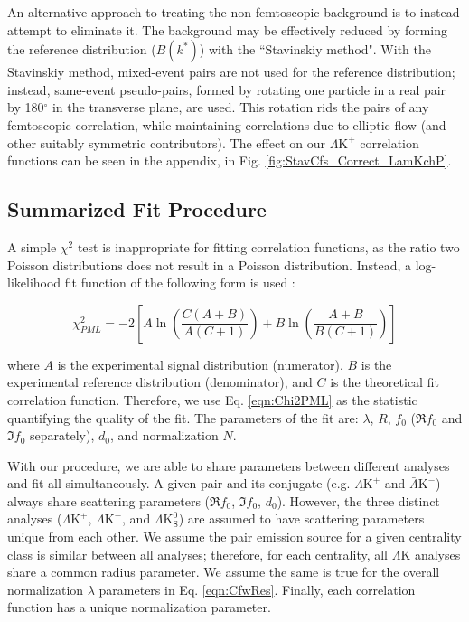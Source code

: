 \documentclass[ALICE,manyauthors]{cernphprep}
\newcommand{\LamK}{$\Lambda$K\xspace}
\newcommand{\LamKchP}{$\Lambda\mathrm{K^{+}}$\xspace}
\newcommand{\ALamKchM}{$\bar{\Lambda}\mathrm{K^{-}}$\xspace}
\newcommand{\LamKchM}{$\Lambda\mathrm{K^{-}}$\xspace}
\newcommand{\LamKs}{$\Lambda\mathrm{K^{0}_{S}}$\xspace}
\begin{document}
An alternative approach to treating the non-femtoscopic background is to instead attempt to eliminate it.
The background may be effectively reduced by forming the reference distribution ($B(k^{*})$) with the ``Stavinskiy method".
With the Stavinskiy method, mixed-event pairs are not used for the reference distribution; instead, same-event pseudo-pairs, formed by rotating one particle in a real pair by 180$^\circ$ in the transverse plane, are used.  
This rotation rids the pairs of any femtoscopic correlation, while maintaining correlations due to elliptic flow (and other suitably symmetric contributors).
The effect on our \LamKchP correlation functions can be seen in the appendix, in Fig. \ref{fig:StavCfs_Correct_LamKchP}.


\subsection{Summarized Fit Procedure}
\label{SummarizedFitProcedure}


A simple $\chi^{2}$ test is inappropriate for fitting correlation functions, as the ratio two Poisson distributions does not result in a Poisson distribution.
Instead, a log-likelihood fit function of the following form is used \cite{Lisa:2005dd}:

\begin{equation}
 \chi^{2}_{PML} = -2\left[A\ln\left(\frac{C(A+B)}{A(C+1)}\right) + B\ln\left(\frac{A+B}{B(C+1)}\right)\right]
\label{eqn:Chi2PML}
\end{equation}

where $A$ is the experimental signal distribution (numerator), $B$ is the experimental reference distribution (denominator), and $C$ is the theoretical fit correlation function.
Therefore, we use Eq. \ref{eqn:Chi2PML} as the statistic quantifying the quality of the fit.
The parameters of the fit are: $\lambda$, $R$, $f_{0}$ ($\Re f_{0}$ and $\Im f_{0}$ separately), $d_{0}$, and normalization $N$.

With our procedure, we are able to share parameters between different analyses and fit all simultaneously.
A given pair and its conjugate (e.g. \LamKchP and \ALamKchM) always share scattering parameters ($\Re f_{0}$, $\Im f_{0}$, $d_{0}$).
However, the three distinct analyses (\LamKchP, \LamKchM, and \LamKs) are assumed to have scattering parameters unique from each other.
We assume the pair emission source for a given centrality class is similar between all analyses; therefore, for each centrality, all \LamK analyses share a common radius parameter.
We assume the same is true for the overall normalization $\lambda$ parameters in Eq. \ref{eqn:CfwRes}.
Finally, each correlation function has a unique normalization parameter.
\end{document}
